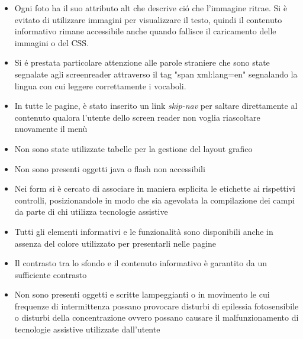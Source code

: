 \documentclass[12pt]{article}
\begin{document}
\begin{itemize}
				\item Ogni foto ha il suo attributo alt che descrive ci\'o che l'immagine ritrae.
				Si \`e evitato di utilizzare immagini per visualizzare il testo, quindi il contenuto informativo rimane accessibile anche quando fallisce il caricamento delle immagini o del CSS.
				\item Si \'e prestata particolare attenzione alle parole straniere che sono state segnalate agli screenreader attraverso il tag "span xml:lang=en" segnalando la lingua con cui leggere correttamente i vocaboli. 
				\item In tutte le pagine, \`e stato inserito un link \textit{skip-nav} per saltare direttamente al contenuto qualora l'utente dello screen reader non voglia riascoltare nuovamente il men\`u
				\item Non sono state utilizzate tabelle per la gestione del layout grafico
				\item Non sono presenti oggetti java o flash non accessibili
				\item Nei form si \`e cercato di associare in maniera esplicita le etichette ai rispettivi controlli, posizionandole in modo che sia agevolata la compilazione dei campi da parte di chi utilizza tecnologie assistive
				\item Tutti gli elementi informativi e le funzionalit\`a sono disponibili anche in assenza del colore utilizzato per presentarli nelle pagine
				\item Il contrasto tra lo sfondo e il contenuto informativo è garantito da un sufficiente contrasto
				\item Non sono presenti oggetti e scritte lampeggianti o in movimento le cui frequenze di intermittenza possano provocare disturbi di epilessia fotosensibile o disturbi della concentrazione ovvero possano causare il malfunzionamento di tecnologie assistive utilizzate dall’utente
				\end{itemize}
	
	
\end{document}
